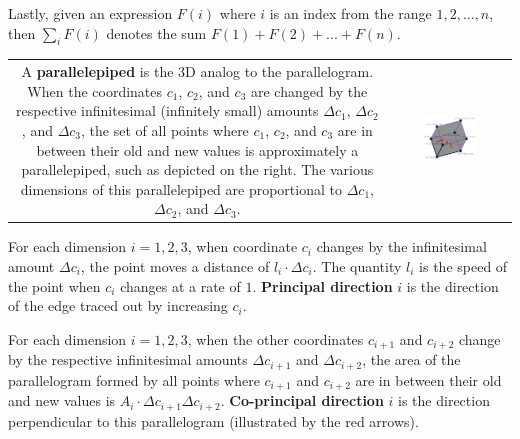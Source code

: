 \documentclass{book}
\begin{document}
Lastly, given an expression \(F(i)\) where \(i\) is an index from the range \(1, 2, ..., n\), then \(\sum_i F(i)\) denotes the sum \(F(1) + F(2) + ... + F(n)\).

\vspace{1mm}

\begin{tabular}{cc}
\parbox{0.5\textwidth}{
A {\bf parallelepiped} is the 3D analog to the parallelogram. When the coordinates \(c_1\), \(c_2\), and \(c_3\) are changed by the respective infinitesimal (infinitely small) amounts \(\Delta c_1\), \(\Delta c_2\), and \(\Delta c_3\), the set of all points where \(c_1\), \(c_2\), and \(c_3\) are in between their old and new values is approximately a parallelepiped, such as depicted on the right. The various dimensions of this parallelepiped are proportional to \(\Delta c_1\), \(\Delta c_2\), and \(\Delta c_3\). 
} & \parbox{0.5\textwidth}{
\includegraphics[width = 0.5\textwidth]{Coordinate_systems/coordinate_system_cell}
}
\end{tabular}

\vspace{1mm}

For each dimension \(i = 1, 2, 3\), when coordinate \(c_i\) changes by the infinitesimal amount \(\Delta c_i\), the point moves a distance of \(l_i \cdot \Delta c_i\). The quantity \(l_i\) is the speed of the point when \(c_i\) changes at a rate of \(1\). {\bf Principal direction} \(i\) is the direction of the edge traced out by increasing \(c_i\). 

For each dimension \(i = 1, 2, 3\), when the other coordinates \(c_{i+1}\) and \(c_{i+2}\) change by the respective infinitesimal amounts \(\Delta c_{i+1}\) and \(\Delta c_{i+2}\), the area of the parallelogram formed by all points where \(c_{i+1}\) and \(c_{i+2}\) are in between their old and new values is \(A_i \cdot \Delta c_{i+1} \Delta c_{i+2}\). {\bf Co-principal direction} \(i\) is the direction perpendicular to this parallelogram (illustrated by the red arrows). 
\end{document}
